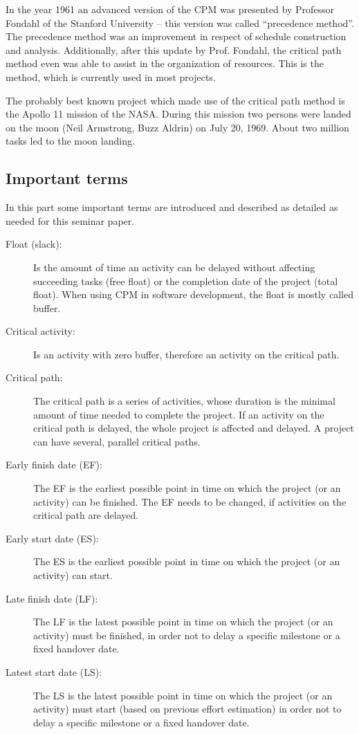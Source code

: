In the year 1961 an advanced version of the CPM was presented by Professor Fondahl of the Stanford
University – this version was called “precedence method”. The precedence method was an improvement
in respect of schedule construction and analysis. Additionally, after this update by Prof. Fondahl,
the critical path method even was able to assist in the organization of resources. This is the
method, which is currently used in most projects\cite{Uher}.

The probably best known project which made use of the critical path method is the Apollo 11 mission
of the NASA. During this mission two persons were landed on the moon (Neil Armstrong, Buzz Aldrin)
on July 20, 1969. About two million tasks led to the moon landing. 

\subsection{Important terms}

In this part some important terms are introduced and described as detailed as needed for this
seminar paper. 

\begin{description}
  \item[Float (slack):] Is the amount of time an activity can be delayed without affecting succeeding tasks
(free float) or the completion date of the project (total float). When using CPM in software
development, the float is mostly called buffer. 
  \item[Critical activity:] Is an activity with zero buffer, therefore an activity on the critical path. 
  \item[Critical path:] The critical path is a series of activities, whose duration is the minimal amount of
time needed to complete the project.  If an activity on the critical path is delayed, the whole
project is affected and delayed. A project can have several, parallel critical paths.
  \item[Early finish date (EF):] The EF is the earliest possible point in time on which the project (or an
activity) can be finished. The EF needs to be changed, if activities on the critical path are
delayed. 
  \item[Early start date (ES):] The ES is the earliest possible point in time on which the project (or an
activity) can start. 
  \item[Late finish date (LF):] The LF is the latest possible point in time on which the project (or an
activity) must be finished, in order not to delay a specific milestone or a fixed handover date.
  \item[Latest start date (LS):] The LS is the latest possible point in time on which the project (or an
activity) must start (based on previous effort estimation) in order not to delay a specific
milestone or a fixed handover date.
\end{description}

